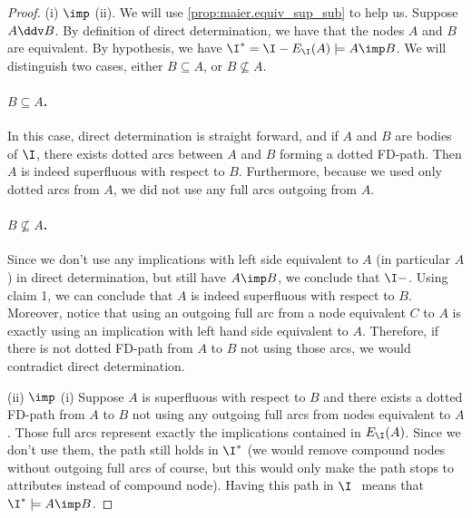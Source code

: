 \begin{proof} (i) $\imp$ (ii). We will use \ref{prop:maier.equiv_sup_sub} to 
help us. Suppose $ A \ddv B$. By definition of direct determination, we have 
that the nodes $A$ and $B$ are equivalent. By hypothesis, we have $ \I^{*} = \I 
- E_{\I}(A) \models A \imp B$. We will distinguish two cases, either $B 
\subseteq A$, or $B \nsubseteq A$. 

\vspace{1.2em}

\paragraph{$B \subseteq A$.} In this case, direct determination is straight 
forward, and if $A$ and $B$ are bodies of $\I$, there exists dotted arcs 
between $A$ and $B$ forming a dotted FD-path. Then $A$ is indeed 
superfluous with respect to $B$. Furthermore, because we used only dotted arcs 
from $A$, we did not use any full arcs outgoing from $A$.

\paragraph{$B \nsubseteq A$.} Since we don't use any implications with left 
side equivalent to $A$ (in particular $A$) in direct determination, but still 
have $A \imp B$, we conclude that $\I - $. Using claim 1, we can conclude that 
$A$ is indeed superfluous with respect to $B$. Moreover, notice that using an 
outgoing full arc from a node equivalent $C$ to $A$ is exactly using an 
implication with left hand side equivalent to $A$. Therefore, if there is not 
dotted FD-path from $A$ to $B$ not using those arcs, we would contradict direct 
determination.

\vspace{1.2em}

(ii) $\imp$ (i) Suppose $A$ is superfluous with respect to $B$ and there 
exists a dotted FD-path from $A$ to $B$ not using any outgoing full arcs 
from nodes equivalent to $A$. Those full arcs represent exactly the 
implications contained in $E_{\I}(A)$. Since we don't use them, the path still 
holds in $\I^{*}$ (we would remove compound nodes without outgoing full arcs of 
course, but this would only make the path stops to attributes instead of 
compound node). Having this path in $\I^{~}$ means that $\I^{*} \models A \imp 
B$.

\end{proof}